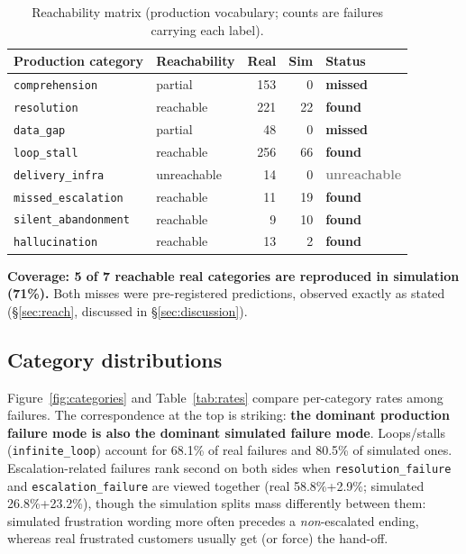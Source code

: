 \documentclass[11pt,a4paper]{article}
\newcommand{\cat}[1]{\texttt{#1}}
\newcommand{\found}[0]{\textcolor{deepblue}{\textbf{found}}}
\newcommand{\missed}[0]{\textcolor{red!70!black}{\textbf{missed}}}
\newcommand{\unreach}[0]{\textcolor{gray}{\textbf{unreachable}}}
\begin{document}
\begin{table}[H]
\centering
\caption{Reachability matrix (production vocabulary; counts are failures carrying each label).}
\label{tab:reach}
\begin{tabular}{llrrl}
\toprule
Production category & Reachability & Real & Sim & Status \\
\midrule
\cat{comprehension}       & partial     & 153 &  0 & \missed \\
\cat{resolution}          & reachable   & 221 & 22 & \found  \\
\cat{data\_gap}           & partial     &  48 &  0 & \missed \\
\cat{loop\_stall}         & reachable   & 256 & 66 & \found  \\
\cat{delivery\_infra}     & unreachable &  14 &  0 & \unreach \\
\cat{missed\_escalation}  & reachable   &  11 & 19 & \found  \\
\cat{silent\_abandonment} & reachable   &   9 & 10 & \found  \\
\cat{hallucination}       & reachable   &  13 &  2 & \found  \\
\bottomrule
\end{tabular}
\end{table}

\noindent\textbf{Coverage: 5 of 7 reachable real categories are reproduced in simulation (71\%).}
Both misses were pre-registered predictions, observed exactly as stated
(\S\ref{sec:reach}, discussed in \S\ref{sec:discussion}).

\subsection{Category distributions}
Figure~\ref{fig:categories} and Table~\ref{tab:rates} compare per-category rates among failures.
The correspondence at the top is striking: \textbf{the dominant production failure mode is also
the dominant simulated failure mode}. Loops/stalls (\cat{infinite\_loop}) account for 68.1\% of
real failures and 80.5\% of simulated ones. Escalation-related failures rank second on both sides
when \cat{resolution\_failure} and \cat{escalation\_failure} are viewed together (real
58.8\%+2.9\%; simulated 26.8\%+23.2\%), though the simulation splits mass differently between
them: simulated frustration wording more often precedes a \emph{non}-escalated ending, whereas
real frustrated customers usually get (or force) the hand-off.
\end{document}
